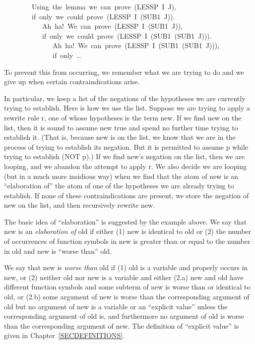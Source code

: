 \documentclass[10pt]{book}
\newenvironment{pubasis}{\begin{flushleft}}{\end{flushleft}}
\begin{document}
\begin{pubasis}
~~~~~~~~Using~the~lemma~we~can~prove~(LESSP~I~J),\\
~~~~~~~~if~only~we~could~prove~(LESSP~I~(SUB1~J)).\\

~~~~~~~~~~~Ah~ha!~We~can~prove~(LESSP~I~(SUB1~J)),\\
~~~~~~~~~~~if~only~we~could~prove~(LESSP~I~(SUB1~(SUB1~J))).\\

~~~~~~~~~~~~~~Ah~ha!~We~can~prove~(LESSP~I~(SUB1~(SUB1~J))),\\
~~~~~~~~~~~~~~if~only~\ldots{}\\
\end{pubasis}
To prevent this from occurring, we
remember what we are trying to do and we give up when certain contraindications
arise.

In particular, we keep a list of the
negations of the hypotheses we are currently trying to establish.
Here is how we use the list.  Suppose we are trying to apply a rewrite
rule r, one of whose hypotheses is the term new.
If we find new on the list, then it is sound to assume new
true and spend no further time trying to establish it.  (That is,
because new is on the list, we know that we are in the process of trying to
establish its negation.  But it is permitted to assume p while trying
to establish (NOT p).)  If we find
new's negation on the list, then we are looping, and we abandon the attempt
to apply r.
We also decide we are looping (but in a much more insidious way)
when we find that the atom of new is an ``elaboration of''
the atom of  one of the hypotheses we are
already trying to establish.  If none of these contraindications are present, we
store the negation of new  on the list, and then recursively rewrite new.

The basic idea of ``elaboration'' is suggested by the example
above.  We say that new is an \emph{elaboration of} old
if either (1) new is identical to old or (2) the
number of occurrences of function symbols in new is greater than
or equal to the number in old and new is ``worse than'' old.

We say that new is \emph{worse than} old if (1) old is a variable
and properly occurs in new, or (2) neither old nor new is
a variable and either (2.a) new and old have different
function symbols and some subterm of new is worse than
or identical to old, or (2.b) some argument of new is worse than
the corresponding argument of old but no argument of
new is a variable or an ``explicit value'' unless
the corresponding argument of old is, and furthermore
no argument of old is worse than the corresponding argument of new.
The definition of ``explicit value'' is given in 
Chapter~\ref{SECDEFINITIONS}.
\end{document}
